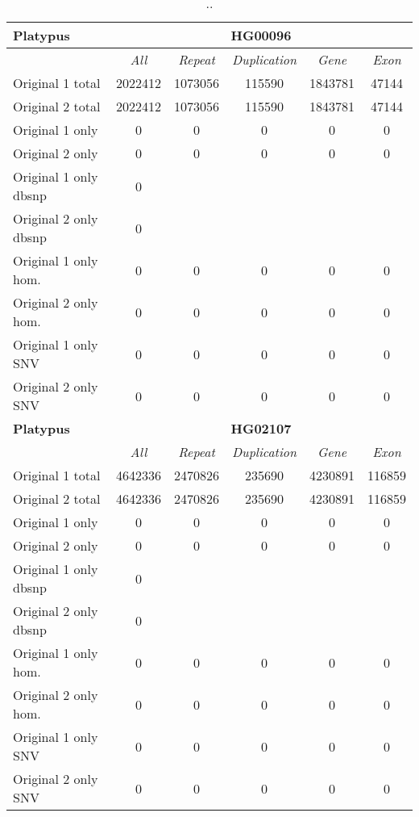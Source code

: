 \begin{table}[htb]
\begin{center}
\begin{tabular}{|l|c||c|c|c|c|}
\hline
{\bf Platypus} & \multicolumn{5}{|c|}{\bf HG00096} \\
\hline
\cline{2-6}
{\bf} & {\it All} & {\it Repeat} & {\it Duplication} & {\it Gene} & {\it Exon} \\
\hline
Original 1 total & 2022412 & 1073056 & 115590 & 1843781 & 47144\\ 
\hline
Original 2 total & 2022412 & 1073056 & 115590 & 1843781 & 47144\\ 
\hline
Original 1 only & 0 & 0 & 0 & 0 & 0\\ 
\hline
Original 2 only & 0 & 0 & 0 & 0 & 0\\ 
\hline
Original 1 only dbsnp & 0 &  &  &  & \\ 
\hline
Original 2 only dbsnp & 0 &  &  &  & \\ 
\hline
Original 1 only hom. & 0 & 0 & 0 & 0 & 0\\ 
\hline
Original 2 only hom. & 0 & 0 & 0 & 0 & 0\\ 
\hline
Original 1 only SNV & 0 & 0 & 0 & 0 & 0\\ 
\hline
Original 2 only SNV & 0 & 0 & 0 & 0 & 0\\ 
\hline
\hline
{\bf Platypus} & \multicolumn{5}{|c|}{\bf HG02107} \\
\hline
\cline{2-6}
{\bf} & {\it All} & {\it Repeat} & {\it Duplication} & {\it Gene} & {\it Exon} \\
\hline
Original 1 total & 4642336 & 2470826 & 235690 & 4230891 & 116859\\ 
\hline
Original 2 total & 4642336 & 2470826 & 235690 & 4230891 & 116859\\ 
\hline
Original 1 only & 0 & 0 & 0 & 0 & 0\\ 
\hline
Original 2 only & 0 & 0 & 0 & 0 & 0\\ 
\hline
Original 1 only dbsnp & 0 &  &  &  & \\ 
\hline
Original 2 only dbsnp & 0 &  &  &  & \\ 
\hline
Original 1 only hom. & 0 & 0 & 0 & 0 & 0\\ 
\hline
Original 2 only hom. & 0 & 0 & 0 & 0 & 0\\ 
\hline
Original 1 only SNV & 0 & 0 & 0 & 0 & 0\\ 
\hline
Original 2 only SNV & 0 & 0 & 0 & 0 & 0\\ 
\hline
\end{tabular}
\end{center}
\caption{ .. }
\label{tab:orig-vs-orig2-platypus}
\end{table}

